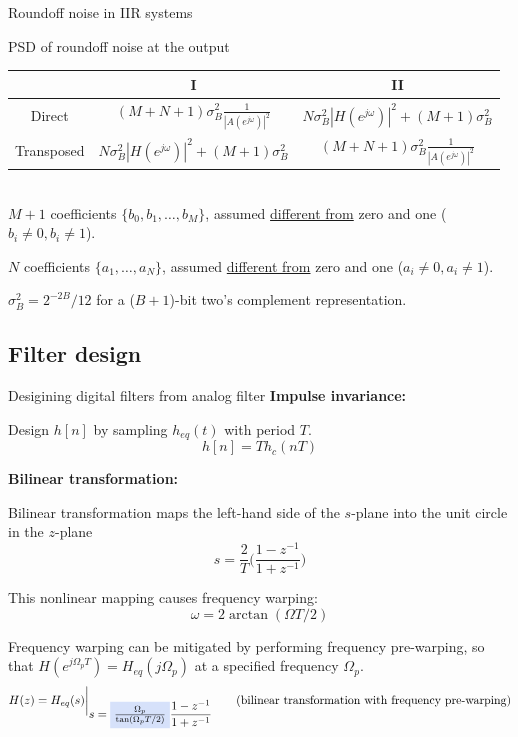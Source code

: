 \documentclass[10pt]{beamer}
\begin{document}
%
\begin{frame}{Roundoff noise in IIR systems}

PSD of roundoff noise at the output
~\\

\begin{tabular}{c||c|c}
	& I & II \\
	\hline
	Direct & $\displaystyle(M+N+1)\sigma_B^2\frac{1}{|A(e^{j\omega})|^2}$ & $\displaystyle N\sigma_{B}^2|H(e^{j\omega})|^2 + (M+1)\sigma_{B}^2$ \\
	Transposed & $\displaystyle N\sigma_B^2|H(e^{j\omega})|^2 + (M+1)\sigma_B^2$ & $\displaystyle (M+N+1)\sigma_B^2\frac{1}{|A(e^{j\omega})|^2}$ \\
	\hline
\end{tabular}
~\\

$M+1$ coefficients $\{b_0, b_1, \ldots, b_M\}$, assumed \underline{different from} zero and one ($b_i \neq 0, b_i \neq 1$).

$N$ coefficients $\{a_1, \ldots, a_N\}$,  assumed \underline{different from} zero and one ($a_i \neq 0, a_i \neq 1$).

$\sigma_B^2 = 2^{-2B}/12$ for a ($B+1$)-bit two's complement representation.

\end{frame}

\subsection{Filter design}
\begin{frame}{Desigining digital filters from analog filter}
	\textbf{Impulse invariance:}
	
	Design $h[n]$ by sampling $h_{eq}(t)$ with period $T$.
	\begin{equation}
	h[n] = Th_c(nT) \tag{impulse invariance}
	\end{equation}
	
	\textbf{Bilinear transformation:}
	
	Bilinear transformation maps the left-hand side of the $s$-plane into the unit circle in the $z$-plane
	\begin{equation*}
	s = \frac{2}{T}\bigg(\frac{1 - z^{-1}}{1 + z^{-1}}\bigg) \tag{Bilinear transformation}
	\end{equation*}
	
	This nonlinear mapping causes frequency warping:
	\begin{equation*}
	\omega =2\arctan(\Omega T/2) \tag{frequency warping}
	\end{equation*}
	
	Frequency warping can be mitigated by performing frequency pre-warping, so that $H(e^{j\Omega_p T}) = H_{eq}(j\Omega_p)$ at a specified frequency $\Omega_p$.
	\begin{equation*}
	H(z) = H_{eq}(s)\bigg|_{\displaystyle s = \tikz[baseline]{\node[fill=blue2!20,anchor=base] {$\frac{\Omega_p}{\tan(\Omega_pT/2)}$};}\frac{1 - z^{-1}}{1 + z^{-1}}} \tag{bilinear transformation with frequency pre-warping}
	\end{equation*}	
\end{frame}
\end{document}
